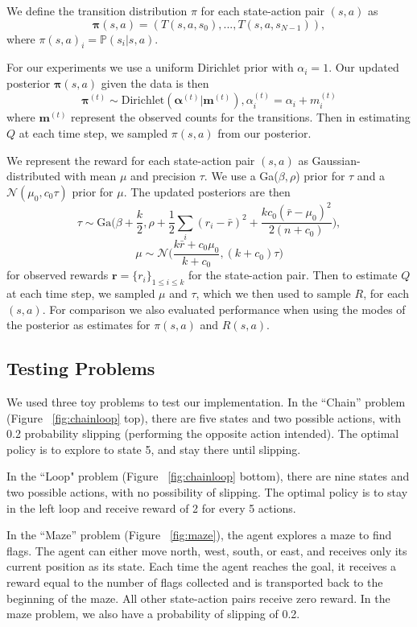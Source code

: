 \documentclass[10pt, twocolumn, twoside]{article}
\begin{document}
We define the transition distribution $\pi$ for each state-action pair $(s, a)$ as
\begin{equation*}
\mathbf{\pi}(s, a) = (T(s, a, s_0), ..., T(s, a, s_{N-1})),
\end{equation*}
where $\pi(s, a)_i = \mathbb{P}(s_i| s, a)$.

For our experiments we use a uniform Dirichlet prior with $\alpha_i = 1$.
Our updated posterior $\mathbf{\pi}(s, a)$ given the data is then
\begin{equation*}
\mathbf{\pi}^{(t)} \sim \textrm{Dirichlet}(\mathbf{\alpha}^{(t)}| \mathbf{m}^{(t)}),
\alpha^{(t)}_i = \alpha_i + m_i^{(t)}
\end{equation*}
where $\mathbf{m}^{(t)}$ represent the observed counts for the transitions.
Then in estimating $Q$ at each time step, we sampled $\pi(s, a)$ from our posterior.

We represent the reward for each state-action pair $(s, a)$ as Gaussian-
distributed with mean $\mu$ and precision $\tau$. We use a Ga($\beta,\rho$)
prior for $\tau$ and a $\mathcal{N}(\mu_0, c_0\tau)$ prior for $\mu$. The
updated posteriors are then
$$\tau \sim \textrm{Ga}\Big(\beta + \frac{k}{2}, \rho + \frac{1}{2}\sum_i(r_i - \bar{r})^2
+ \frac{kc_0(\bar{r}-\mu_0)^2}{2(n+c_0)}\Big),$$
$$\mu \sim \mathcal{N}\Big(\frac{k\bar{r} + c_0\mu_0}{k + c_0}, (k+c_0)\tau\Big)$$
for observed rewards $\mathbf{r} = \{r_i\}_{1\le i \le k}$ for the state-action pair.
Then to estimate $Q$ at each time step, we sampled $\mu$ and $\tau$, which we then used
to sample $R$, for each $(s, a)$.
For comparison we also evaluated performance when using the modes of the posterior as
estimates for $\pi(s, a)$ and $R(s,a)$.

\subsection{Testing Problems}
We used three toy problems to test our implementation. In the ``Chain'' problem
(Figure ~\ref{fig:chainloop} top), there are five states and two possible actions, with 0.2
probability slipping (performing the opposite action intended). The optimal
policy is to explore to state 5, and stay there until slipping.

In the ``Loop" problem (Figure ~\ref{fig:chainloop} bottom), there are nine states and
two possible actions, with no possibility of slipping. The optimal policy is to stay
in the left loop and receive reward of 2 for every 5 actions.

In the ``Maze'' problem (Figure ~\ref{fig:maze}), the agent explores a maze to find
flags. The agent can either move north, west, south, or east, and receives only its
current position as its state. Each time the agent reaches the goal, it receives a reward
equal to the number of flags collected and is transported back to the beginning of the
maze. All other state-action pairs receive zero reward. In the maze problem, we also
have a probability of slipping of 0.2.
\end{document}
